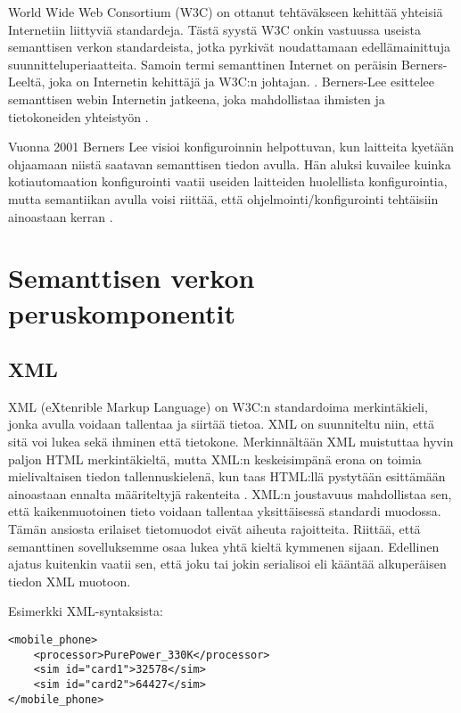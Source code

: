 \documentclass[finnish, 12pt, a4paper, elec, utf8, pdfa, online]{aaltothesis}
\begin{document}
World Wide Web Consortium (W3C) on ottanut tehtäväkseen kehittää yhteisiä Internetiin liittyviä standardeja. Tästä syystä W3C onkin vastuussa useista semanttisen verkon standardeista, jotka pyrkivät noudattamaan edellämainittuja suunnitteluperiaatteita. Samoin termi semanttinen Internet on peräisin Berners-Leeltä, joka on Internetin kehittäjä ja W3C:n johtajan. \cite{W3C}. Berners-Lee esittelee semanttisen webin Internetin jatkeena, joka mahdollistaa ihmisten ja tietokoneiden yhteistyön \cite{Berners_visio}.


Vuonna 2001 Berners Lee visioi konfiguroinnin helpottuvan, kun laitteita kyetään ohjaamaan niistä saatavan semanttisen tiedon avulla. Hän aluksi kuvailee kuinka kotiautomaation konfigurointi vaatii useiden laitteiden huolellista konfigurointia, mutta semantiikan avulla voisi riittää, että ohjelmointi/konfigurointi tehtäisiin ainoastaan kerran \cite{Berners_visio}.







\clearpage
\section{Semanttisen verkon peruskomponentit}

\subsection{XML}
XML (eXtenrible Markup Language) on W3C:n standardoima merkintäkieli, jonka avulla voidaan tallentaa ja siirtää tietoa. XML on suunniteltu niin, että sitä voi lukea sekä ihminen että tietokone. Merkinnältään XML muistuttaa hyvin paljon HTML merkintäkieltä, mutta XML:n keskeisimpänä erona on toimia mielivaltaisen tiedon tallennuskielenä, kun taas HTML:llä pystytään esittämään ainoastaan ennalta määriteltyjä rakenteita \cite{IEEE_XML}. XML:n joustavuus mahdollistaa sen, että kaikenmuotoinen tieto voidaan tallentaa yksittäisessä standardi muodossa. Tämän ansiosta erilaiset tietomuodot eivät aiheuta rajoitteita. Riittää, että semanttinen sovelluksemme osaa lukea yhtä kieltä kymmenen sijaan. Edellinen ajatus kuitenkin vaatii sen, että joku tai jokin serialisoi eli kääntää alkuperäisen tiedon XML muotoon.

Esimerkki XML-syntaksista:
\begin{lstlisting}
<mobile_phone>
	<processor>PurePower_330K</processor>
	<sim id="card1">32578</sim>
	<sim id="card2">64427</sim>
</mobile_phone>
\end{lstlisting}
\end{document}

